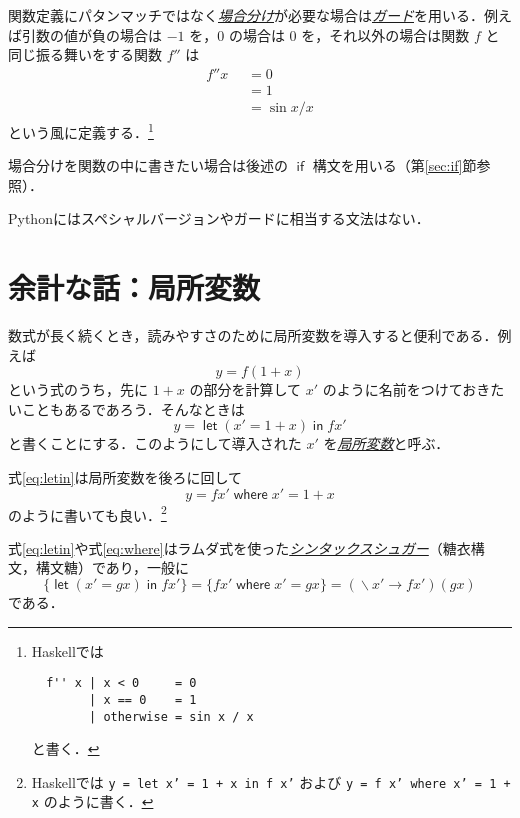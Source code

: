 \documentclass[a4paper,draft]{jsbook}
\newcommand{\programminglanguage}[1]{\textsf{#1}}
\newcommand{\haskell}{\programminglanguage{Haskell}}
\newcommand{\python}{\programminglanguage{Python}}
\newcommand{\keyword}[1]{{\underline{\emph{#1}}}}
\newcommand{\code}[1]{\texttt{#1}}
\newcommand{\mKeyword}[1]{\mathsf{#1}}
\newcommand{\mIfKeyword}{\mKeyword{if}}
\newcommand{\mLetKeyword}{\mKeyword{let}}
\newcommand{\mInKeyword}{\mKeyword{in}}
\newcommand{\mWhereKeyword}{\mKeyword{where}}
\newcommand{\mGuard}[1]{\mathop{\mid_{#1}}}
\DeclareMathOperator{\mLambda}{\backslash}
\DeclareMathOperator{\mLambdaArrow}{\rightarrow}
\DeclareMathOperator{\mIf}{\mIfKeyword}
\DeclareMathOperator{\mWhere}{\mWhereKeyword}
\DeclareMathOperator{\mLet}{\mLetKeyword} %
\DeclareMathOperator{\mInKW}{\mInKeyword} %
\newcommand{\mLetIn}[2]{\mLet{#1}\mInKW{#2}}
\newcommand{\mLambdaExp}[2]{\mLambda{#1}\mLambdaArrow{#2}}
\newcommand{\mathKeyword}[1]{\operatorname{\textsf{#1}}}
\newcommand{\mathOtherwise}{\mathKeyword{otherwise}}
\begin{document}
関数定義にパタンマッチではなく\keyword{場合分け}が必要な場合は\keyword{ガード}を用いる．例えば引数の値が負の場合は $-1$ を，$0$ の場合は $0$ を，それ以外の場合は関数 $f$ と同じ振る舞いをする関数 $f''$ は
\begin{equation}
\begin{split}
f''x&\mGuard{x<0}=0\\
&\mGuard{x\equiv 0}=1\\
&\mGuard{\mathOtherwise}=\sin x/x
\end{split}
\end{equation}
という風に定義する．\footnote{\haskell では
\begin{verbatim}
  f'' x | x < 0     = 0
        | x == 0    = 1
        | otherwise = sin x / x
\end{verbatim}
と書く．}

場合分けを関数の中に書きたい場合は後述の $\mIf$ 構文を用いる（第\ref{sec:if}節参照）．

\python にはスペシャルバージョンやガードに相当する文法はない．

\section{余計な話：局所変数}

数式が長く続くとき，読みやすさのために局所変数を導入すると便利である．例えば
\begin{equation}
y=f(1+x)
\end{equation}
という式のうち，先に $1+x$ の部分を計算して $x'$ のように名前をつけておきたいこともあるであろう．そんなときは
\begin{equation}
\label{eq:letin}
y=\mLetIn{(x'=1+x)}{fx'}
\end{equation}
と書くことにする．このようにして導入された $x'$ を\keyword{局所変数}と呼ぶ．

式\eqref{eq:letin}は局所変数を後ろに回して
\begin{equation}
\label{eq:where}
y=fx'\mWhere x'=1+x
\end{equation}
のように書いても良い．\footnote{\haskell では \code{y = let x' = 1 + x in f x'} および \code{y = f x' where x' = 1 + x} のように書く．}

式\eqref{eq:letin}や式\eqref{eq:where}はラムダ式を使った\keyword{シンタックスシュガー}（糖衣構文，構文糖）であり，一般に
\begin{equation}
\{\mLetIn{(x'=gx)}{fx'}\}
=\{fx'\mWhere x'=gx\}
=(\mLambdaExp{x'}{fx'})(gx)
\end{equation}
である．
\end{document}
